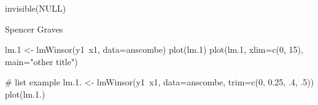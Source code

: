 \begin{Value}
invisible(NULL)
\end{Value}
\begin{Author}\relax
Spencer Graves
\end{Author}
\begin{SeeAlso}\relax
{}
\end{SeeAlso}
\begin{Examples}
\begin{ExampleCode}
lm.1 <- lmWinsor(y1~x1, data=anscombe)
plot(lm.1)
plot(lm.1, xlim=c(0, 15), main="other title")

# list example
lm.1. <- lmWinsor(y1~x1, data=anscombe, trim=c(0, 0.25, .4, .5)) 
plot(lm.1.)

\end{ExampleCode}
\end{Examples}

